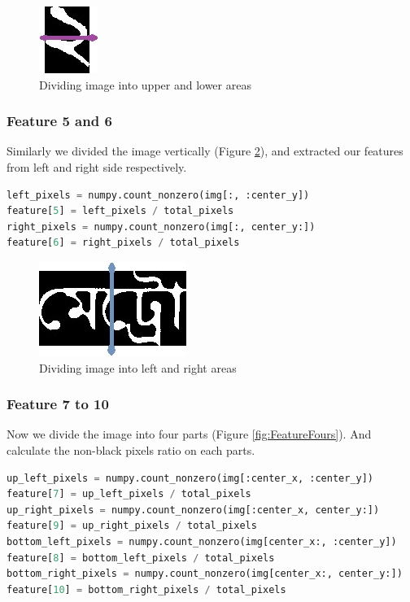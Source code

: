 \documentclass{standalone}
\begin{document}
\begin{figure}
\centering
\includegraphics{img/feature/hor}
\caption{Dividing image into upper and lower areas}
\label{fig:FeatureHor}
\end{figure}

\subsubsection{Feature 5 and 6}
Similarly we divided the image vertically (Figure \ref{fig:FeatureVer}), and extracted our features from left and right side respectively.
\begin{lstlisting}[language=Python]
left_pixels = numpy.count_nonzero(img[:, :center_y])
feature[5] = left_pixels / total_pixels
right_pixels = numpy.count_nonzero(img[:, center_y:])
feature[6] = right_pixels / total_pixels
\end{lstlisting}

\begin{figure}
\centering
\includegraphics{./img/feature/ver}
\caption{Dividing image into left and right areas}
\label{fig:FeatureVer}
\end{figure}


\subsubsection{Feature 7 to 10}
Now we divide the image into four parts (Figure \ref{fig:FeatureFours}). And calculate the non-black pixels ratio on each parts.
\begin{lstlisting}[language=Python]
up_left_pixels = numpy.count_nonzero(img[:center_x, :center_y])
feature[7] = up_left_pixels / total_pixels
up_right_pixels = numpy.count_nonzero(img[:center_x, center_y:])
feature[9] = up_right_pixels / total_pixels
bottom_left_pixels = numpy.count_nonzero(img[center_x:, :center_y])
feature[8] = bottom_left_pixels / total_pixels
bottom_right_pixels = numpy.count_nonzero(img[center_x:, center_y:])
feature[10] = bottom_right_pixels / total_pixels
\end{lstlisting}
\end{document}
